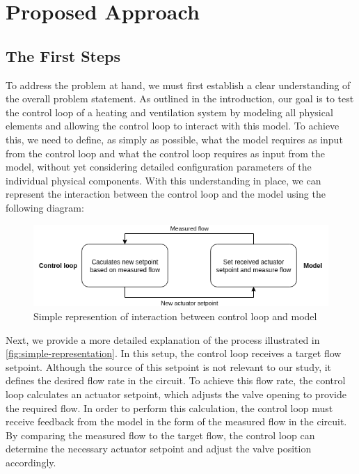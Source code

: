 \documentclass[we,final,11pt,oneside,openany]{uantwerpenbamathesis}
\begin{document}


\chapter{Proposed Approach}
\label{ch:proposed-approach}

\section{The First Steps}
\label{sec:the-first-steps}

To address the problem at hand, we must first establish a clear understanding of the overall problem statement.
As outlined in the introduction, our goal is to test the control loop of a heating and ventilation system by modeling all physical elements and allowing the control loop to interact with this model.
To achieve this, we need to define, as simply as possible, what the model requires as input from the control loop and what the control loop requires as input from the model, without yet considering detailed configuration parameters of the individual physical components.
With this understanding in place, we can represent the interaction between the control loop and the model using the following diagram:

\begin{figure}[h!]
    \centering
    \includegraphics[width=0.6\linewidth]{Images/generated/simple-representation}
    \caption{Simple represention of interaction between control loop and model}
    \label{fig:simple-representation}
\end{figure}

Next, we provide a more detailed explanation of the process illustrated in \autoref{fig:simple-representation}.
In this setup, the control loop receives a target flow setpoint.
Although the source of this setpoint is not relevant to our study, it defines the desired flow rate in the circuit.
To achieve this flow rate, the control loop calculates an actuator setpoint, which adjusts the valve opening to provide the required flow.
In order to perform this calculation, the control loop must receive feedback from the model in the form of the measured flow in the circuit.
By comparing the measured flow to the target flow, the control loop can determine the necessary actuator setpoint and adjust the valve position accordingly.
\end{document}
